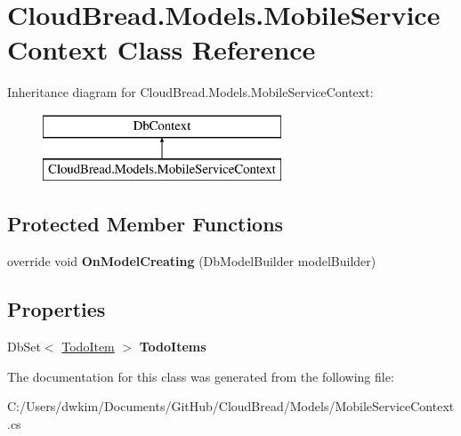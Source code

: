 \hypertarget{a00080}{}\section{Cloud\+Bread.\+Models.\+Mobile\+Service\+Context Class Reference}
\label{a00080}
Inheritance diagram for Cloud\+Bread.\+Models.\+Mobile\+Service\+Context\+:\begin{figure}[H]
\begin{center}
\leavevmode
\includegraphics[height=2.000000cm]{a00080}
\end{center}
\end{figure}
\subsection*{Protected Member Functions}
\begin{DoxyCompactItemize}
\item 
override void {\bfseries On\+Model\+Creating} (Db\+Model\+Builder model\+Builder)\hypertarget{a00080_a98c14d9e5b9403754d5b717f672ed77f}{}\label{a00080_a98c14d9e5b9403754d5b717f672ed77f}

\end{DoxyCompactItemize}
\subsection*{Properties}
\begin{DoxyCompactItemize}
\item 
Db\+Set$<$ \hyperlink{a00106}{Todo\+Item} $>$ {\bfseries Todo\+Items}\hypertarget{a00080_aa02a40c8717cd4fa77923470c670f56d}{}\label{a00080_aa02a40c8717cd4fa77923470c670f56d}

\end{DoxyCompactItemize}


The documentation for this class was generated from the following file\+:\begin{DoxyCompactItemize}
\item 
C\+:/\+Users/dwkim/\+Documents/\+Git\+Hub/\+Cloud\+Bread/\+Models/Mobile\+Service\+Context.\+cs\end{DoxyCompactItemize}
